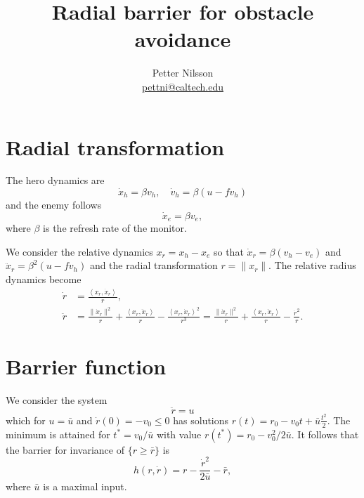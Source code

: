 \documentclass[letterpaper, 12pt]{article}
\title{Radial barrier for obstacle avoidance}
\author{Petter Nilsson \\ \href{mailto:pettni@caltech.edu}{pettni@caltech.edu}}
\begin{document}
\maketitle

\section{Radial transformation}

The hero dynamics are
\begin{equation}
	\dot x_h = \beta v_h, \quad \dot v_h = \beta (u - f v_h)
\end{equation}
and the enemy follows
\begin{equation}
	\dot x_e = \beta v_e,
\end{equation}
where $\beta$ is the refresh rate of the monitor.

We consider the relative dynamics $x_r = x_h - x_e$ so that $\dot x_r = \beta (v_h - v_e)$ and $\ddot x_r = \beta^2 (u - f v_h)$ and the radial transformation $r = \| x_r \|$. The relative radius dynamics become
\begin{equation}
\begin{aligned}
	\dot r & = \frac{\left\langle x_r, \dot x_r \right\rangle}{r}, \\
	\ddot r & = \frac{\| \dot x_r \|^2}{r} + \frac{\left\langle x_r, \ddot x_r \right\rangle}{r} - \frac{\left\langle x_r, \dot x_r \right\rangle^2}{r^3} = \frac{\| \dot x_r \|^2}{r} + \frac{\left\langle x_r, \ddot x_r \right\rangle}{r} - \frac{\dot r^2}{r}.
\end{aligned}
\end{equation}


\section{Barrier function}

We consider the system
\begin{equation}
	\ddot r = u
\end{equation}
which for $u = \bar u$ and $\dot r(0) = -v_0 \leq 0$ has solutions $r(t) = r_0 - v_0 t + \bar u\frac{t^2}{2}$. The minimum is attained for $t^* = v_0/\bar u$ with value $r(t^*) = r_0 -  v_0^2/2 \bar u$. It follows that the barrier for invariance of $\{ r \geq \bar r \}$ is 
\begin{equation}
	h(r, \dot r) = r - \frac{\dot r^2}{2 \bar u} - \bar r,
\end{equation}
where $\bar u$ is a maximal input.
\end{document}
